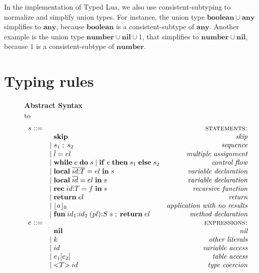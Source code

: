 \documentclass{sigplanconf}
\newcommand{\Any}{\mathbf{any}}
\newcommand{\Nil}{\mathbf{nil}}
\newcommand{\Boolean}{\mathbf{boolean}}
\newcommand{\Number}{\mathbf{number}}
\def\dstart{\hbox to \hsize{\vrule depth 4pt\hrulefill\vrule depth 4pt}}
\begin{document}
In the implementation of Typed Lua, we also use consistent-subtyping to normalize and simplify union types.
For instance, the union type $\Boolean \cup \Any$ simplifies
to $\Any$, because $\Boolean$ is a consistent-subtype
of $\Any$. Another example is the union type
$\Number \cup \Nil \cup 1$, that simplifies to
$\Number \cup \Nil$, because $1$ is a consistent-subtype of $\Number$.

\section{Typing rules}
\label{sec:rules}

\begin{figure*}[!ht]
	\textbf{Abstract Syntax}\\
	\dstart
	$$
	\begin{array}{rlr}
	s ::= & & \textsc{statements:}\\
	& \;\; \mathbf{skip} & \textit{skip}\\
	& | \; s_{1} \; ; \; s_{2} & \textit{sequence}\\
	& | \; \overline{l} = el & \textit{multiple assignment}\\
	& | \; \mathbf{while} \; e \; \mathbf{do} \; s \;
	| \; \mathbf{if} \; e \; \mathbf{then} \; s_{1} \; \mathbf{else} \; s_{2} & \textit{control flow}\\
	& | \; \mathbf{local} \; \overline{id{:}T} = el \; \mathbf{in} \; s & \textit{variable declaration}\\
	& | \; \mathbf{local} \; \overline{id} = el \; \mathbf{in} \; s & \textit{variable declaration}\\
	& | \; \mathbf{rec} \; id{:}T = f \; \mathbf{in} \; s & \textit{recursive function} \\
	& | \; \mathbf{return} \; el & \textit{return} \\
	& | \; \lfloor a \rfloor_{0} & \textit{application with no results}\\
	& | \; \mathbf{fun} \; id_{1}{:}id_{2} \; (pl){:}S \; s \;;\; \mathbf{return} \; el & \textit{method declaration}\\
	e ::= & & \textsc{expressions:}\\
	& \;\; \mathbf{nil} & \textit{nil}\\
	& | \; k & \textit{other literals}\\
	& | \; id & \textit{variable access}\\
	& | \; e_{1}[e_{2}] & \textit{table access}\\
	& | \; {<}T{>} \; id & \textit{type coercion}\\

\end{array}$$
\end{figure*}
\end{document}
